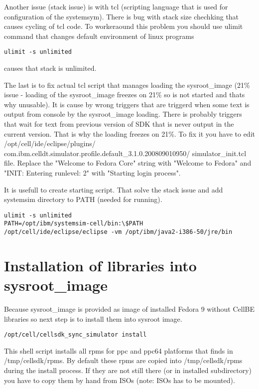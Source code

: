\par
Another issue (stack issue) is with tcl (scripting language that is used for configuration of the systemsym). There is bug with stack size chechking that causes cycling of tcl code. To workeraound this problem you should use ulimit command that changes default environment of linux programs

\begin{verbatim}
ulimit -s unlimited
\end{verbatim}

causes that stack is unlimited.

\par
The last is to fix actual tcl script that manages loading the sysroot\_image (21\% issue - loading of the sysroot\_image freezes on 21\% so is not started and thats why unusable). It is cause by wrong triggers that are triggerd when some text is output from console by the sysroot\_image loading. There is probably triggers that wait for text from previous version of SDK that is never output in the current version. That is why the loading freezes on 21\%. To fix it you have to edit /opt/cell/ide/eclipse/plugins/ com.ibm.celldt.simulator.profile.default\_3.1.0.200809010950/ simulator\_init.tcl file. Replace the "Welcome to Fedora Core" string with "Welcome to Fedora" and "INIT: Entering runlevel: 2" with "Starting login process".

It is usefull to create starting script. That solve the stack issue and add systemsim directory to PATH (needed for running).

\begin{verbatim}
ulimit -s unlimited
PATH=/opt/ibm/systemsim-cell/bin:\$PATH
/opt/cell/ide/eclipse/eclipse -vm /opt/ibm/java2-i386-50/jre/bin
\end{verbatim}

\section{Installation of libraries into sysroot\_image}

Because sysroot\_image is provided as image of installed Fedora 9 without CellBE libraries so next step is to install them into sysroot image.

\begin{verbatim}
/opt/cell/cellsdk_sync_simulator install
\end{verbatim}

This shell script installs all rpms for ppc and ppc64 platforms that finds in /tmp/cellsdk/rpms. By default these rpms are copied into /tmp/cellsdk/rpms during the install process. If they are not still there (or in installed subdirectory) you have to copy them by hand from ISOs (note: ISOs has to be mounted).

